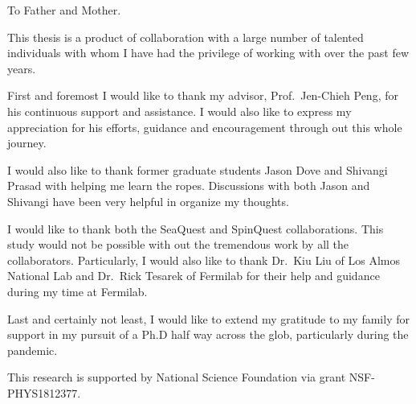 \documentclass[../main.tex]{subfiles}
\begin{document}
\begin{dedication}
	To Father and Mother.
\end{dedication}

\begin{acknowledgments}
	This thesis is a product of collaboration with a large number of talented
	individuals with whom I have had the privilege of working with over the past
	few years.

	First and foremost I would like to thank my advisor, Prof.~Jen-Chieh Peng, for
	his continuous support and assistance. I would also like to express my
	appreciation for his efforts, guidance and encouragement through out this whole
	journey.

	I would also like to thank former graduate students Jason Dove and Shivangi
	Prasad with helping me learn the ropes. Discussions with both Jason and
	Shivangi have been very helpful in organize my thoughts.

	I would like to thank both the SeaQuest and SpinQuest collaborations.
	This study would not be possible with out the tremendous work by all the
	collaborators. Particularly, I would also like to thank Dr.~Kiu Liu of Los Almos
	National Lab and Dr.~Rick Tesarek of Fermilab for their help and guidance during
	my time at Fermilab.

	Last and certainly not least, I would like to extend my gratitude to my family
	for support in my pursuit of a Ph.D half way across the glob, particularly
	during the pandemic.

	This research is supported by National Science Foundation via grant NSF-PHYS1812377.

\end{acknowledgments}
\end{document}
